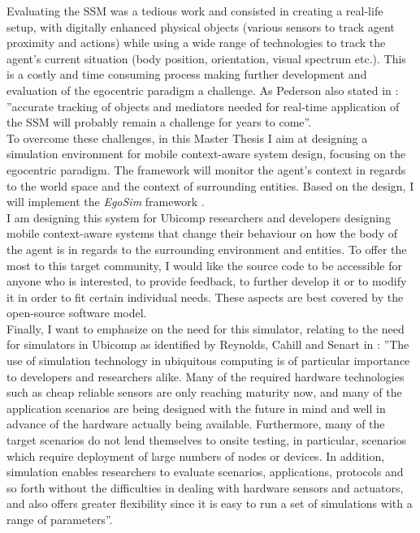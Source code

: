Evaluating the SSM was a tedious work and consisted in creating a real-life setup, with digitally enhanced physical objects (various sensors to track agent proximity and actions) while using a wide range of technologies to track the agent's current situation (body position, orientation, visual spectrum etc.). This is a costly and time consuming process making further development and evaluation of the egocentric paradigm a challenge. As Pederson also stated in \cite{pederson2011situative}: ''accurate tracking of objects and mediators needed for real-time application of the SSM will probably remain a challenge for years to come''.\\

To overcome these challenges, in this Master Thesis I aim at designing a simulation environment for mobile context-aware system design, focusing on the egocentric paradigm. The framework will monitor the agent's context in regards to the world space and the context of surrounding entities. Based on the design, I will implement the \emph{EgoSim} framework \cite{egosim:online}.\\ 

I am designing this system for Ubicomp researchers and developers designing mobile context-aware systems that change their behaviour on how the body of the agent is in regards to the surrounding environment and entities. To offer the most to this target community, I would like the source code to be accessible for anyone who is interested, to provide feedback, to further develop it or to modify it in order to fit certain individual needs. These aspects are best covered by the open-source software model.\\

Finally, I want to emphasize on the need for this simulator, relating to the need for simulators in Ubicomp as identified by Reynolds, Cahill and Senart in \cite{reynolds2006requirements}: ''The use of simulation technology in ubiquitous computing is of particular importance to developers and researchers alike. Many of the required hardware technologies such as cheap reliable sensors are only reaching maturity now, and many of the application scenarios are being designed with the future in mind and well in advance of the hardware actually being available. Furthermore, many of the target scenarios do not lend themselves to onsite testing, in particular, scenarios which require deployment of large numbers of nodes or devices. In addition, simulation enables researchers to evaluate scenarios, applications, protocols and so forth without the difficulties in dealing with hardware sensors and actuators, and also offers greater flexibility since it is easy to run a set of simulations with a range of parameters''.\\









